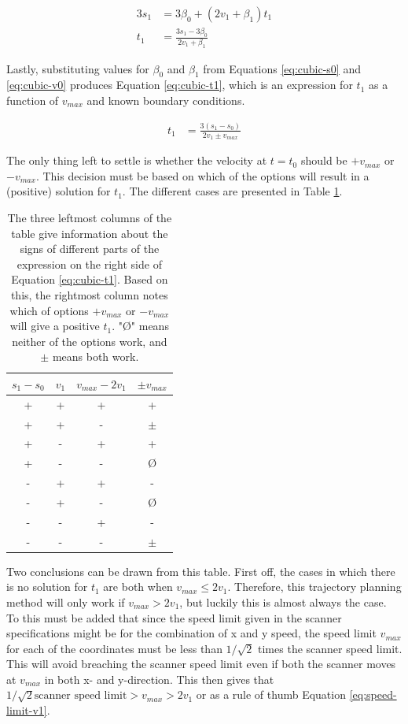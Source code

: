 \begin{align}
    3s_1 &= 3\beta_0 + (2v_1 + \beta_1)t_1 \label{eq:cubic-3s1} \\
    t_1 &= \frac{3s_1-3\beta_0}{2v_1 + \beta_1}
\end{align}

Lastly, substituting values for $\beta_0$ and $\beta_1$ from Equations \ref{eq:cubic-s0} and \ref{eq:cubic-v0} produces Equation \ref{eq:cubic-t1}, which is an expression for $t_1$ as a function of $v_{max}$ and known boundary conditions.

\begin{align}
    t_1 &= \frac{3(s_1-s_0)}{2v_1 \pm v_{max}} \label{eq:cubic-t1}
\end{align}

The only thing left to settle is whether the velocity at $t=t_0$ should be $+v_{max}$ or $-v_{max}$. This decision must be based on which of the options will result in a (positive) solution for $t_1$. The different cases are presented in Table \ref{tab:t1-vs-vmax}.

\begin{table}[]
    \centering
    \begin{tabular}{c|c|c|c}
        $s_1 - s_0$ & $v_1$ & $v_{max} - 2v_1$ & $\pm v_{max}$ \\ \hline
        + & + & + & + \\  \hline
        + & + & - & $\pm$ \\ \hline
        + & - & + & + \\ \hline
        + & - & - & Ø \\ \hline
        - & + & + & - \\ \hline
        - & + & - & Ø \\ \hline
        - & - & + & - \\ \hline
        - & - & - & $\pm$
    \end{tabular}
    \caption{The three leftmost columns of the table give information about the signs of different parts of the expression on the right side of Equation \ref{eq:cubic-t1}. Based on this, the rightmost column notes which of options $+v_{max}$ or $-v_{max}$ will give a positive $t_1$. "Ø" means neither of the options work, and $\pm$ means both work.}
    \label{tab:t1-vs-vmax}
\end{table}

Two conclusions can be drawn from this table. First off, the cases in which there is no solution for $t_1$ are both when $v_{max} \leq 2v_1$. Therefore, this trajectory planning method will only work if $v_{max} > 2v_1$, but luckily this is almost always the case. To this must be added that since the speed limit given in the scanner specifications might be for the combination of x and y speed, the speed limit $v_{max}$ for each of the coordinates must be less than $1/\sqrt{2}$ times the scanner speed limit. This will avoid breaching the scanner speed limit even if both the scanner moves at $v_{max}$ in both x- and y-direction. This then gives that $1/\sqrt{2} \text{scanner speed limit} > v_{max} > 2v_1$ or as a rule of thumb Equation \ref{eq:speed-limit-v1}.

